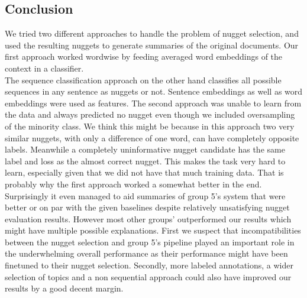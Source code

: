 \subsection{Conclusion}
We tried two different approaches to handle the problem of nugget selection, and used the resulting nuggets to generate summaries of the original documents.
Our first approach worked wordwise by feeding averaged word embeddings of the context in a classifier.\\
The sequence classification approach on the other hand classifies all possible sequences in any sentence as nuggets or not. Sentence embeddings as well as word embeddings were used as features. 
The second approach was unable to learn from the data and always predicted no nugget even though we included oversampling of the minority class. We think this might be because in this approach two very similar nuggets, with only a difference of one word, can have completely opposite labels. Meanwhile a completely uninformative nugget candidate has the same label and loss as the almost correct nugget. This makes the task very hard to learn, especially given that we did not have that much training data. That is probably why the first approach worked a somewhat better in the end. Surprisingly it even managed to aid summaries of group 5's system that were better or on par with the given baselines despite relatively unsatisfying nugget evaluation results. However most other groups' outperformed our results which might have multiple possible explanations. First we suspect that incompatibilities between the nugget selection and group 5's pipeline played an important role in the underwhelming overall performance as their performance might have been finetuned to their nugget selection. Secondly, more labeled annotations, a wider selection of topics and a non sequential approach could also have improved our results by a good decent margin.